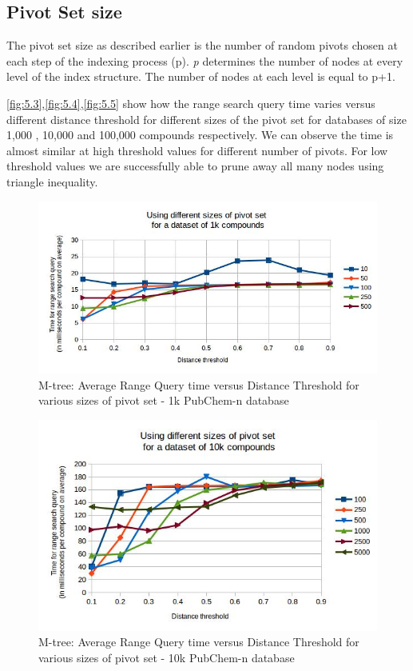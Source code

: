 \subsection{Pivot Set size}
The pivot set size as described earlier is the number of random pivots chosen at each step of the indexing process (p). \textit{p} determines the number of nodes at every level of the index structure. The number of nodes at each level is equal to p+1.

\autoref{fig:5.3},\autoref{fig:5.4},\autoref{fig:5.5}  show how the range search query time varies versus different distance threshold for different sizes of the pivot set for databases of size 1,000 , 10,000 and 100,000 compounds respectively. We can observe the time is almost similar at high threshold values for different number of pivots. For low threshold values we are successfully able to prune away all many nodes using triangle inequality. 


\begin{figure}[ht!]	
\centering
\includegraphics[width=1 \columnwidth]{img/image2.jpg}
\caption{M-tree: Average Range Query time versus Distance Threshold for various sizes of pivot set - 1k PubChem-n database}
\label{fig:5.3}
\end{figure}


\begin{figure}[ht!]	
\centering
\includegraphics[width=1 \columnwidth]{img/image3.jpg}
\caption{M-tree: Average Range Query time versus Distance Threshold for various sizes of pivot set - 10k PubChem-n database}
\label{fig:5.4}
\end{figure}


